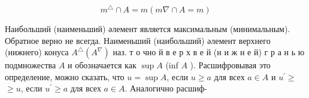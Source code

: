 \documentclass[10pt]{article}
\begin{document}
\[

m^{\triangle} \cap A=m(m \nabla \cap A=m)

\]



Наибольший (наименьший) әлемент является максимальным (минимальным). Обратное верно не всегда. Наименьший (наибольший) әлемент верхнего (нижнего) конуса $A^{\triangle}\left(A^{\nabla}\right)$ наз. т о чно й в е р х в е й (н и ж н е й) г р а н ь ю подмножества $A$ и обозначается как $\sup A$ (inf $A$ ). Расшифровывая это определение, можно сказать, что $u=\sup A$, если $u \geqslant a$ для всех $a \in A$ и $u^{\prime} \geqslant$ $\geqslant u$, если $u^{\prime} \geqslant a$ для всех $a \in A$. Аналогично расшиф-
\end{document}
